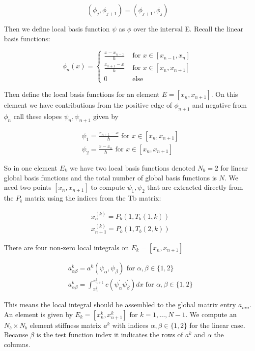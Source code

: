 \documentclass[12pt, oneside]{book}
\begin{document}
$$
\left(\phi_{j}, \phi_{j+1}\right)=\left(\phi_{j+1}, \phi_{j}\right)
$$

Then we define local basis function $\psi$ as $\phi$ over the interval E.
Recall the linear basis functions:

$$
\phi_{n}(x)=\left\{\begin{array}{cl}
\frac{x-x_{n-1}}{h} & \text { for } x \in\left[x_{n-1}, x_{n}\right] \\
\frac{x_{n+1}-x}{h} & \text { for } x \in\left[x_{n}, x_{n+1}\right] \\
0 & \text { else }
\end{array}\right.
$$

Then define the local basis functions for an element $E=\left[x_{n}, x_{n+1}\right]$. On this element we have contributions from the positive edge of $\phi_{n+1}$ and negative from $\phi_{n}$ call these slopes $\psi_{n}, \psi_{n+1}$ given by

$$
\begin{aligned}
& \psi_{1}=\frac{x_{n+1}-x}{h} \text { for } x \in\left[x_{n}, x_{n+1}\right] \\
& \psi_{2}=\frac{x-x_{n}}{h} \text { for } x \in\left[x_{n}, x_{n+1}\right]
\end{aligned}
$$

So in one element $E_{k}$ we have two local basis functions denoted $N_{b}=2$ for linear global basis functions and the total number of global basis functions is $N$. We need two points $\left[x_{n}, x_{n+1}\right]$ to compute $\psi_{1}, \psi_{2}$ that are extracted
directly from the $P_{b}$ matrix using the indices from the Tb matrix:

$$
\begin{aligned}
& x_{n}^{(k)}=P_{b}\left(1, T_{b}(1, k)\right) \\
& x_{n+1}^{(k)}=P_{b}\left(1, T_{b}(2, k)\right)
\end{aligned}
$$

There are four non-zero local integrals on $E_{k}=\left[x_{n}, x_{n+1}\right]$

$$
\begin{aligned}
& a_{\alpha \beta}^{k}=a^{k}\left(\psi_{\alpha}, \psi_{\beta}\right) \text { for } \alpha, \beta \in\{1,2\} \\
& a_{\alpha \beta}^{k}=\int_{x_{n}^{k}}^{x_{n+1}^{k}} c\left(\psi_{\alpha}^{\prime} \psi_{\beta}^{\prime}\right) d x \text { for } \alpha, \beta \in\{1,2\}
\end{aligned}
$$

This means the local integral should be assembled to the global matrix entry $a_{m n}$. An element is given by $E_{k}=\left[x_{n}^{k}, x_{n+1}^{k}\right]$ for $k=1, \ldots, N-1$. We compute an $N_{b} \times N_{b}$ element stiffness matrix $a^{k}$ with indices $\alpha, \beta \in\{1,2\}$ for the linear case. Because $\beta$ is the test function index it indicates the rows of $a^{k}$ and $\alpha$ the columns.
\end{document}
